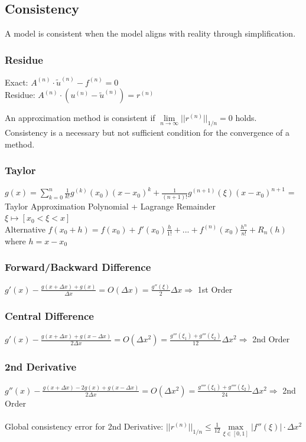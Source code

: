 \subsection{Consistency}
A model is consistent when the model aligns with reality through simplification.

\subsubsection{Residue}
Exact: $A^{(n)}\cdot \tilde{u}^{(n)}-f^{(n)}=0$\\
Residue: $A^{(n)}\cdot (u^{(n)}-\tilde{u}^{(n)})=r^{(n)}$

An approximation method is consistent if $\boxed{\lim\limits_{n\rightarrow \infty}||r^{(n)}||_{1/n}=0}$ holds.\\

Consistency is a necessary but not sufficient condition for the convergence of a method.

\subsubsection{Taylor}
$g(x)= \sum\limits_{k=0}^n\frac{1}{k!} g^{(k)}(x_0)(x-x_0)^k +
\frac{1}{(n+1)!}g^{(n+1)}(\xi)(x-x_0)^{n+1}$ = Taylor
Approximation Polynomial  + Lagrange Remainder\\
$\xi \longmapsto [x_0 < \xi < x]$\\

Alternative
$ f(x_0+h)=f(x_0)+f'(x_0)\frac{h}{1!}+...+f^{(n)}(x_0)\frac{h^n}{n!}+R_n(h) $ where $ h = x - x_0 $

\subsubsection{Forward/Backward Difference}
$g'(x) - \frac{g(x+\Delta x) + g(x)}{\Delta x}= O(\Delta x) =
\frac{g''(\xi)}{2}\Delta x \Rightarrow$  1st Order

\subsubsection{Central Difference}
$g'(x) - \frac{g(x+\Delta x) + g(x-\Delta x)}{2\Delta x}= O(\Delta x^2) =
\frac{g'''(\xi_1) + g'''(\xi_2)}{12}\Delta x^2 \Rightarrow$ 2nd Order

\subsubsection{2nd Derivative}
$g''(x) - \frac{g(x+\Delta x) -2 g(x)+ g(x-\Delta x)}{2\Delta x}= O(\Delta x^2) =
\frac{g''''(\xi_1) + g''''(\xi_2)}{24}\Delta x^2 \Rightarrow$ 2nd Order\\
\\
Global consistency error for 2nd Derivative: $||r^{(n)}||_{1/n}\leq \frac 1{12}\max\limits_{\xi\in[0,1]}|f''(\xi)|\cdot \Delta x^2$

